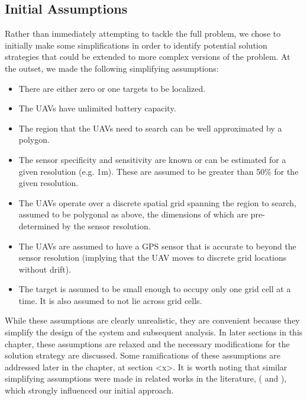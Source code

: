 \subsection{Initial Assumptions}

Rather than immediately attempting to tackle the full problem, we chose to initially make some simplifications in order to identify potential solution strategies that could be extended to more complex versions of the problem. At the outset, we made the following simplifying assumptions:
\begin{itemize}
    \item There are either zero or one targets to be localized.
    \item The UAVs have unlimited battery capacity.
    \item The region that the UAVs need to search can be well approximated by a polygon.
    \item The sensor specificity and sensitivity are known or can be estimated for a given resolution (e.g. 1m). These are assumed to be greater than 50\% for the given resolution.
    \item The UAVs operate over a discrete spatial grid spanning the region to search, assumed to be polygonal as above, the dimensions of which are pre-determined by the sensor resolution.
    \item The UAVs are assumed to have a GPS sensor that is accurate to beyond the sensor resolution (implying that the UAV moves to discrete grid locations without drift).
    \item The target is assumed to be small enough to occupy only one grid cell at a time. It is also assumed to not lie across grid cells.
\end{itemize}
While these assumptions are clearly unrealistic, they are convenient because they simplify the design of the system and subsequent analysis. In later sections in this chapter, these assumptions are relaxed and the necessary modifications for the solution strategy are discussed. Some ramifications of these assumptions are addressed later in the chapter, at section <x>. It is worth noting that similar simplifying assumptions were made in related works in the literature, 
(\cite{Chung2007ASearch} and \cite{Waharte2010SupportingUAVs}), %
which strongly influenced our initial approach.